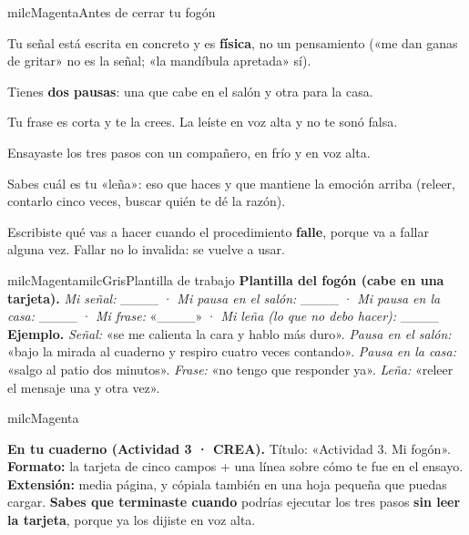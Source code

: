 \documentclass[11pt,letterpaper]{article}
\begin{document}
\begin{drawbox}{milcMagenta}{Antes de cerrar tu fogón}
\begin{checklista}
\item Tu señal está escrita en concreto y es \textbf{física}, no un pensamiento («me dan ganas de gritar» no es la señal; «la mandíbula apretada» sí).
\item Tienes \textbf{dos pausas}: una que cabe en el salón y otra para la casa.
\item Tu frase es corta y te la crees. La leíste en voz alta y no te sonó falsa.
\item Ensayaste los tres pasos con un compañero, en frío y en voz alta.
\item Sabes cuál es tu «leña»: eso que haces y que mantiene la emoción arriba (releer, contarlo cinco veces, buscar quién te dé la razón).
\item Escribiste qué vas a hacer cuando el procedimiento \textbf{falle}, porque va a fallar alguna vez. Fallar no lo invalida: se vuelve a usar.
\end{checklista}
\end{drawbox}

\begin{softbox}{milcMagenta}{milcGris}{Plantilla de trabajo}
\textbf{Plantilla del fogón (cabe en una tarjeta).} \emph{Mi señal:} \_\_\_\_ · \emph{Mi pausa en el salón:} \_\_\_\_ · \emph{Mi pausa en la casa:} \_\_\_\_ · \emph{Mi frase:} «\_\_\_\_» · \emph{Mi leña (lo que no debo hacer):} \_\_\_\_ \\[1mm]
\textbf{Ejemplo.} \emph{Señal:} «se me calienta la cara y hablo más duro». \emph{Pausa en el salón:} «bajo la mirada al cuaderno y respiro cuatro veces contando». \emph{Pausa en la casa:} «salgo al patio dos minutos». \emph{Frase:} «no tengo que responder ya». \emph{Leña:} «releer el mensaje una y otra vez».
\end{softbox}

\begin{infoband}{milcMagenta}


\textbf{En tu cuaderno (Actividad 3 · CREA).} Título: «Actividad 3. Mi fogón». \textbf{Formato:} la tarjeta de cinco campos + una línea sobre cómo te fue en el ensayo. \textbf{Extensión:} media página, y cópiala también en una hoja pequeña que puedas cargar. \textbf{Sabes que terminaste cuando} podrías ejecutar los tres pasos \textbf{sin leer la tarjeta}, porque ya los dijiste en voz alta.
\end{infoband}
\end{document}
